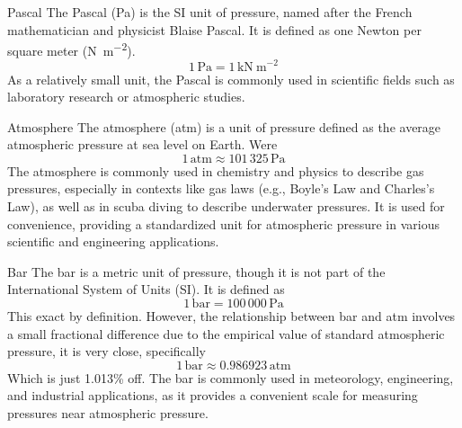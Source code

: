 \documentclass{article}
\begin{document}
\tikzexternaldisable

\begin{briefillus}{Pascal}{}
	The Pascal (Pa) is the SI unit of pressure, named after the French mathematician and physicist Blaise Pascal. It is defined as one Newton per square meter (\si{\newton\per\square\meter}). 
	\[1\,\text{Pa}=1\,\text{kN}\ \text{m}^{-2}\]
	As a relatively small unit, the Pascal is commonly used in scientific fields such as laboratory research or atmospheric studies.
\end{briefillus}

\begin{briefillus}{Atmosphere}{}
	The atmosphere (atm) is a unit of pressure defined as the average atmospheric pressure at sea level on Earth. Were \[1\,\text{atm}\approx101\, 325\,\text{Pa}\]
	The atmosphere is commonly used in chemistry and physics to describe gas pressures, especially in contexts like gas laws (e.g., Boyle's Law and Charles's Law), as well as in scuba diving to describe underwater pressures. It is used for convenience, providing a standardized unit for atmospheric pressure in various scientific and engineering applications.
\end{briefillus}

\begin{briefillus}{Bar}{}
	The bar is a metric unit of pressure, though it is not part of the International System of Units (SI). It is defined as \[1\,\text{bar}=100\, 000\,\text{Pa}\] 
	This exact by definition. However, the relationship between bar and atm involves a small fractional difference due to the empirical value of standard atmospheric pressure, it is very close, specifically $$1\,\text{bar}\approx0.986923\,\text{atm}$$ Which is just 1.013\% off. The bar is commonly used in meteorology, engineering, and industrial applications, as it provides a convenient scale for measuring pressures near atmospheric pressure.
\end{briefillus}
\end{document}
